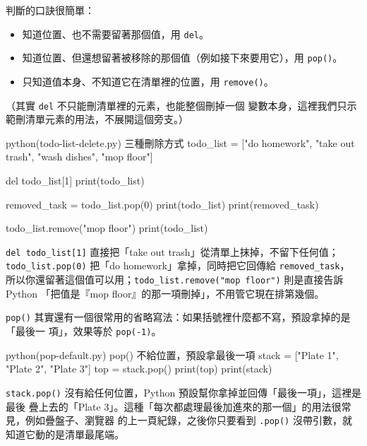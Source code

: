 判斷的口訣很簡單：

\begin{itemize}
\item 知道位置、也不需要留著那個值，用 \texttt{del}。
\item 知道位置、但還想留著被移除的那個值（例如接下來要用它），用 \texttt{pop()}。
\item 只知道值本身、不知道它在清單裡的位置，用 \texttt{remove()}。
\end{itemize}

（其實 \texttt{del} 不只能刪清單裡的元素，也能整個刪掉一個
變數本身，這裡我們只示範刪清單元素的用法，不展開這個旁支。）

\begin{example}{python}{(todo-list-delete.py) 三種刪除方式}
todo_list = ["do homework", "take out trash", "wash dishes", "mop floor"]

del todo_list[1]
print(todo_list)

removed_task = todo_list.pop(0)
print(todo_list)
print(removed_task)

todo_list.remove("mop floor")
print(todo_list)
\end{example}


\texttt{del todo\_list[1]} 直接把「take out trash」從清單上抹掉，不留下任何值；
\texttt{todo\_list.pop(0)} 把「do homework」拿掉，同時把它回傳給 \texttt{removed\_task}，
所以你還留著這個值可以用；\texttt{todo\_list.remove("mop floor")} 則是直接告訴 Python
「把值是『mop floor』的那一項刪掉」，不用管它現在排第幾個。

\texttt{pop()} 其實還有一個很常用的省略寫法：如果括號裡什麼都不寫，預設拿掉的是「最後一
項」，效果等於 \texttt{pop(-1)}。

\begin{example}{python}{(pop-default.py) pop() 不給位置，預設拿最後一項}
stack = ["Plate 1", "Plate 2", "Plate 3"]
top = stack.pop()
print(top)
print(stack)
\end{example}


\texttt{stack.pop()} 沒有給任何位置，Python 預設幫你拿掉並回傳「最後一項」，這裡是最後
疊上去的「Plate 3」。這種「每次都處理最後加進來的那一個」的用法很常見，例如疊盤子、瀏覽器
的上一頁紀錄，之後你只要看到 \texttt{.pop()} 沒帶引數，就知道它動的是清單最尾端。

